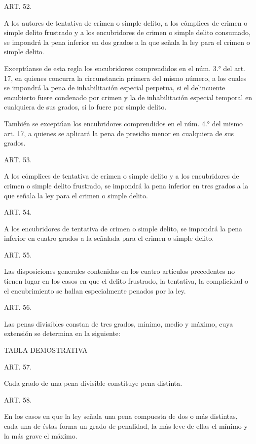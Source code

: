     ART. 52.

    A los autores de tentativa de crimen o simple delito, a los cómplices de crimen o simple delito frustrado y a los encubridores de crimen o simple delito consumado, se impondrá la pena inferior en dos grados a la que señala la ley para el crimen o simple delito.

    Exceptúanse de esta regla los encubridores comprendidos en el núm. 3.° del art. 17, en quienes concurra la circunstancia primera del mismo número, a los cuales se impondrá la pena de inhabilitación especial perpetua, si el delincuente encubierto fuere condenado por crimen y la de inhabilitación especial temporal en cualquiera de sus grados, si lo fuere por simple delito.

    También se exceptúan los encubridores comprendidos en el núm. 4.° del mismo art. 17, a quienes se aplicará la pena de presidio menor en cualquiera de sus grados.


    ART. 53.

    A los cómplices de tentativa de crimen o simple delito y a los encubridores de crimen o simple delito frustrado, se impondrá la pena inferior en tres grados a la que señala la ley para el crimen o simple delito.


    ART. 54.

    A los encubridores de tentativa de crimen o simple delito, se impondrá la pena inferior en cuatro grados a la señalada para el crimen o simple delito.


    ART. 55.

    Las disposiciones generales contenidas en los cuatro artículos precedentes no tienen lugar en los casos en que el delito frustrado, la tentativa, la complicidad o el encubrimiento se hallan especialmente penados por la ley.


    ART. 56.

    Las penas divisibles constan de tres grados, mínimo, medio y máximo, cuya extensión se determina en la siguiente:

    TABLA DEMOSTRATIVA

  



    ART. 57.

    Cada grado de una pena divisible constituye pena distinta.


    ART. 58.

    En los casos en que la ley señala una pena compuesta de dos o más distintas, cada una de éstas forma un grado de penalidad, la más leve de ellas el mínimo y la más grave el máximo.




